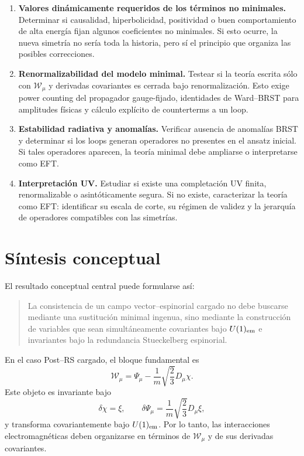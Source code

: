 \documentclass[11pt,a4paper]{article}
\numberwithin{equation}{section}
\newcommand{\Wcal}{\mathcal W}
\begin{document}
\begin{enumerate}[label=(\arabic*)]
\item \textbf{Valores dinámicamente requeridos de los términos no minimales.}
Determinar si causalidad, hiperbolicidad, positividad o buen comportamiento de alta
energía fijan algunos coeficientes no minimales. Si esto ocurre, la nueva simetría no
sería toda la historia, pero sí el principio que organiza las posibles correcciones.

\item \textbf{Renormalizabilidad del modelo minimal.}
Testear si la teoría escrita sólo con $\Wcal_\mu$ y derivadas covariantes es cerrada bajo
renormalización. Esto exige power counting del propagador gauge-fijado, identidades
de Ward--BRST para amplitudes físicas y cálculo explícito de counterterms a un loop.

\item \textbf{Estabilidad radiativa y anomalías.}
Verificar ausencia de anomalías BRST y determinar si los loops generan operadores no
presentes en el ansatz inicial. Si tales operadores aparecen, la teoría minimal debe
ampliarse o interpretarse como EFT.

\item \textbf{Interpretación UV.}
Estudiar si existe una completación UV finita, renormalizable o asintóticamente segura.
Si no existe, caracterizar la teoría como EFT: identificar su escala de corte, su régimen
de validez y la jerarquía de operadores compatibles con las simetrías.

\end{enumerate}

\section{Síntesis conceptual}
\label{sec:sintesis-conceptual}

El resultado conceptual central puede formularse así:
\begin{quote}
La consistencia de un campo vector--espinorial cargado no debe buscarse mediante una
sustitución minimal ingenua, sino mediante la construcción de variables que sean
simultáneamente covariantes bajo $U(1)_{\rm em}$ e invariantes bajo la redundancia
Stueckelberg espinorial.
\end{quote}

En el caso Post--RS cargado, el bloque fundamental es
\begin{equation}
  \Wcal_\mu=
  \Psi_\mu-\frac1m\sqrt{\frac23}D_\mu\chi.
\end{equation}
Este objeto es invariante bajo
\begin{equation}
  \delta\chi=\xi,\qquad
  \delta\Psi_\mu=\frac1m\sqrt{\frac23}D_\mu\xi,
\end{equation}
y transforma covariantemente bajo $U(1)_{\rm em}$. Por lo tanto, las interacciones
electromagnéticas deben organizarse en términos de $\Wcal_\mu$ y de sus derivadas
covariantes.
\end{document}
